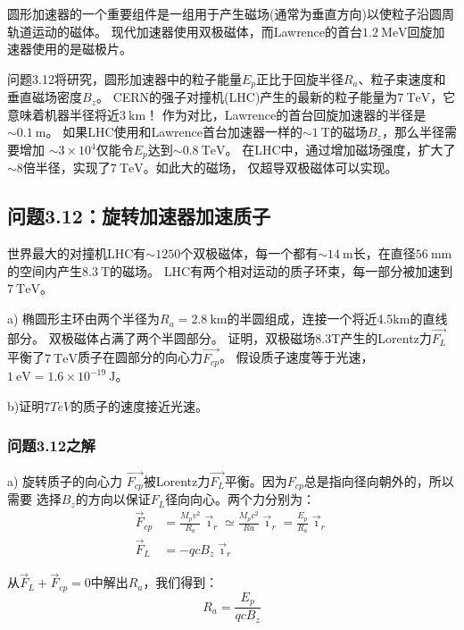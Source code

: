 圆形加速器的一个重要组件是一组用于产生磁场(通常为垂直方向)以使粒子沿圆周轨道运动的磁体。
现代加速器使用双极磁体，而Lawrence的首台$1.2\ \mathrm{MeV}$回旋加速器使用的是磁极片。

问题3.12将研究，圆形加速器中的粒子能量$E_p$正比于回旋半径$R_a$、粒子束速度和垂直磁场密度$B_z$。
CERN的强子对撞机(LHC)产生的最新的粒子能量为$7\ \mathrm{TeV}$，它意味着机器半径将近$3\ \mathrm{km}$！
作为对比，Lawrence的首台回旋加速器的半径是$\sim 0.1\ \mathrm{m}$。
如果LHC使用和Lawrence首台加速器一样的$\sim 1\ \mathrm{T}$的磁场$B_z$，那么半径需要增加
$\sim 3\times 10^4$仅能令$E_p$达到$\sim 0.8\ \mathrm{TeV}$。
在LHC中，通过增加磁场强度，扩大了$\sim 8$倍半径，实现了$7\ \mathrm{TeV}$。如此大的磁场，
仅超导双极磁体可以实现。


\subsection{问题3.12：旋转加速器加速质子}
世界最大的对撞机LHC有$\sim 1250$个双极磁体，每一个都有$\sim 14 \ \mathrm{m}$长，在直径$56\ \mathrm{mm}$的空间内产生$8.3\ \mathrm{T}$的磁场。
LHC有两个相对运动的质子环束，每一部分被加速到$7\ \mathrm{TeV}$。

a) 椭圆形主环由两个半径为$R_a=2.8 \ \mathrm{km}$的半圆组成，连接一个将近4.5km的直线部分。
双极磁体占满了两个半圆部分。
证明，双极磁场8.3T产生的Lorentz力$\vec{F_L}$平衡了$7\ \mathrm{TeV}$质子在圆部分的向心力$\vec{F_{cp}}$。
假设质子速度等于光速，$1\ \mathrm{eV}= 1.6\times 10^{−19}\ \mathrm{J}$。

b)证明$7 TeV$的质子的速度接近光速。

\subsubsection{问题3.12之解}
a) 旋转质子的向心力 $\vec{F_{cp}}$被Lorentz力$\vec{F_L}$平衡。因为$F_{cp}$总是指向径向朝外的，所以需要
选择$B_z$的方向以保证$F_L$径向向心。两个力分别为：
\begin{align*}
\vec{F}_{cp}&=\frac{M_{p}v^{2}}{R_{a}}\vec{\imath}_{r}\simeq\frac{M_{p}c^{2}}{Ra}\vec{\imath}_{r}=\frac{E_{p}}{R_{a}}\vec{\imath}_{r}\tag{S12.1a}\\%
\vec{F}_{L}&=-qcB_{z}\vec{\imath}_{r}\tag{S12.1b}%
\end{align*}

从$\vec{F}_{L}+\vec{F}_{cp}=0$中解出$R_a$，我们得到：
\begin{equation*}
R_a=\frac{E_p}{q c B_z}\tag{S12.2} %
\end{equation*}

